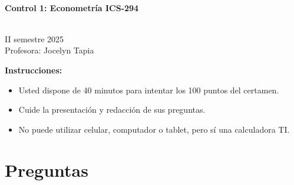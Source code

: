 \documentclass[10pt,a4paper]{article}
\begin{document}
\vspace{5cm}



\begin{center}
\begin{large}
\textbf{\\Control 1: Econometría ICS-294}
\end{large}\\
\vspace{0.2cm}
II semestre 2025\\
Profesora: Jocelyn Tapia\\
\end{center}

\textbf{Instrucciones:} 

\begin{itemize}

    \item Usted dispone de 40 minutos  para intentar los 100 puntos del certamen.
    \item Cuide la presentación y redacción de sus preguntas.
    \item No puede utilizar celular, computador o tablet, pero sí una calculadora TI.
     
\end{itemize}

\section{Preguntas}
\end{document}
